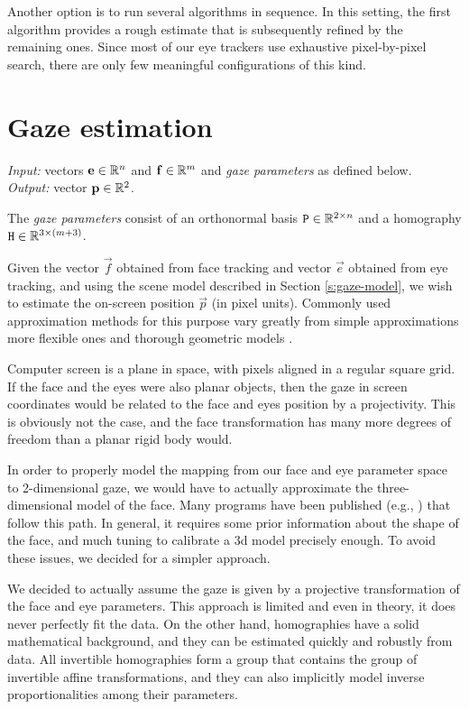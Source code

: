 Another option is to run several algorithms in sequence.
In this setting, the first algorithm provides a rough estimate that is subsequently refined by the remaining ones.
Since most of our eye trackers use exhaustive pixel-by-pixel search, there are only few meaningful configurations of this kind.

\section{Gaze estimation}
\label{s:impl-gaze}

\textit{Input:} vectors $\mathbf{e} \in \mathbb{R}^n$ and $\mathbf{f} \in \mathbb{R}^m$ and \textit{gaze parameters} as defined below.\\
\textit{Output:} vector $\mathbf{p} \in \mathbb{R}^2$.\\

\begin{definition} \label{d:gaze-parameters}
The \textit{gaze parameters} consist of an orthonormal basis $\mathtt{P} \in \mathbb{R}^{2\times n}$ and a homography $\mathtt{H} \in \mathbb{R}^{3 \times (m+3)}$.
\end{definition}

Given the vector $\vec f$ obtained from face tracking and vector $\vec e$ obtained from eye tracking, and using the scene model described in Section \ref{s:gaze-model}, we wish to estimate the on-screen position $\vec p$ (in pixel units).
Commonly used approximation methods for this purpose vary greatly from simple approximations \cite{zhu12} more flexible ones \cite{kassner14,yucel09} and thorough geometric models \cite{villanueva08,wang16}.

Computer screen is a plane in space, with pixels aligned in a regular square grid.
If the face and the eyes were also planar objects, then the gaze in screen coordinates would be related to the face and eyes position by a projectivity.
This is obviously not the case, and the face transformation has many more degrees of freedom than a planar rigid body would.
 
In order to properly model the mapping from our face and eye parameter space to 2-dimensional gaze, we would have to actually approximate the three-dimensional model of the face.
Many programs have been published (e.g., \cite{fanelli11}) that follow this path.
In general, it requires some prior information about the shape of the face, and much tuning to calibrate a 3d model precisely enough.
To avoid these issues, we decided for a simpler approach.

We decided to actually assume the gaze is given by a projective transformation of the face and eye parameters.
This approach is limited and even in theory, it does never perfectly fit the data.
On the other hand, homographies have a solid mathematical background, and they can be estimated quickly and robustly from data.
All invertible homographies form a group that contains the group of invertible affine transformations, and they can also implicitly model inverse proportionalities among their parameters.


